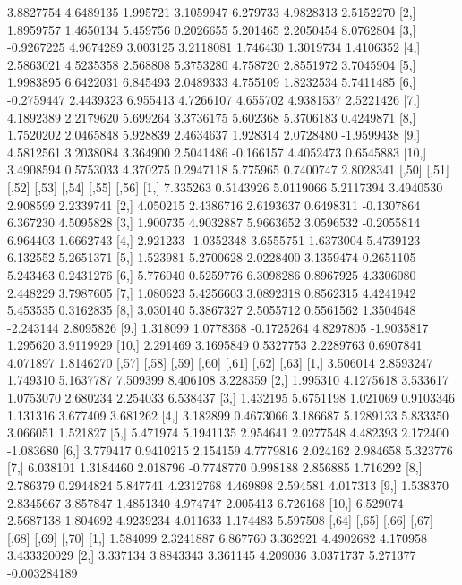 \documentclass[12pt]{article}
\begin{document}
\begin{Schunk}
\begin{Soutput}
 [1,]  3.8827754 4.6489135 1.995721 3.1059947  6.279733 4.9828313  2.5152270
 [2,]  1.8959757 1.4650134 5.459756 0.2026655  5.201465 2.2050454  8.0762804
 [3,] -0.9267225 4.9674289 3.003125 3.2118081  1.746430 1.3019734  1.4106352
 [4,]  2.5863021 4.5235358 2.568808 5.3753280  4.758720 2.8551972  3.7045904
 [5,]  1.9983895 6.6422031 6.845493 2.0489333  4.755109 1.8232534  5.7411485
 [6,] -0.2759447 2.4439323 6.955413 4.7266107  4.655702 4.9381537  2.5221426
 [7,]  4.1892389 2.2179620 5.699264 3.3736175  5.602368 5.3706183  0.4249871
 [8,]  1.7520202 2.0465848 5.928839 2.4634637  1.928314 2.0728480 -1.9599438
 [9,]  4.5812561 3.2038084 3.364900 2.5041486 -0.166157 4.4052473  0.6545883
[10,]  3.4908594 0.5753033 4.370275 0.2947118  5.775965 0.7400747  2.8028341
         [,50]      [,51]      [,52]     [,53]      [,54]     [,55]     [,56]
 [1,] 7.335263  0.5143926  5.0119066 5.2117394  3.4940530  2.908599 2.2339741
 [2,] 4.050215  2.4386716  2.6193637 0.6498311 -0.1307864  6.367230 4.5095828
 [3,] 1.900735  4.9032887  5.9663652 3.0596532 -0.2055814  6.964403 1.6662743
 [4,] 2.921233 -1.0352348  3.6555751 1.6373004  5.4739123  6.132552 5.2651371
 [5,] 1.523981  5.2700628  2.0228400 3.1359474  0.2651105  5.243463 0.2431276
 [6,] 5.776040  0.5259776  6.3098286 0.8967925  4.3306080  2.448229 3.7987605
 [7,] 1.080623  5.4256603  3.0892318 0.8562315  4.4241942  5.453535 0.3162835
 [8,] 3.030140  5.3867327  2.5055712 0.5561562  1.3504648 -2.243144 2.8095826
 [9,] 1.318099  1.0778368 -0.1725264 4.8297805 -1.9035817  1.295620 3.9119929
[10,] 2.291469  3.1695849  0.5327753 2.2289763  0.6907841  4.071897 1.8146270
         [,57]     [,58]    [,59]      [,60]    [,61]    [,62]     [,63]
 [1,] 3.506014 2.8593247 1.749310  5.1637787 7.509399 8.406108  3.228359
 [2,] 1.995310 4.1275618 3.533617  1.0753070 2.680234 2.254033  6.538437
 [3,] 1.432195 5.6751198 1.021069  0.9103346 1.131316 3.677409  3.681262
 [4,] 3.182899 0.4673066 3.186687  5.1289133 5.833350 3.066051  1.521827
 [5,] 5.471974 5.1941135 2.954641  2.0277548 4.482393 2.172400 -1.083680
 [6,] 3.779417 0.9410215 2.154159  4.7779816 2.024162 2.984658  5.323776
 [7,] 6.038101 1.3184460 2.018796 -0.7748770 0.998188 2.856885  1.716292
 [8,] 2.786379 0.2944824 5.847741  4.2312768 4.469898 2.594581  4.017313
 [9,] 1.538370 2.8345667 3.857847  1.4851340 4.974747 2.005413  6.726168
[10,] 6.529074 2.5687138 1.804692  4.9239234 4.011633 1.174483  5.597508
         [,64]     [,65]    [,66]    [,67]      [,68]    [,69]        [,70]
 [1,] 1.584099 2.3241887 6.867760 3.362921  4.4902682 4.170958  3.433320029
 [2,] 3.337134 3.8843343 3.361145 4.209036  3.0371737 5.271377 -0.003284189

\end{Soutput}
\end{Schunk}
\end{document}
